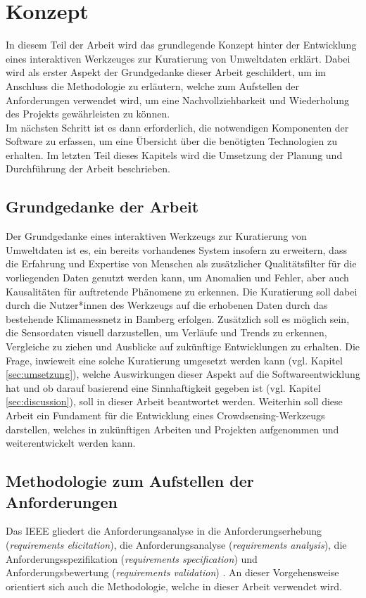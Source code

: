 \chapter{Konzept} %
In diesem Teil der Arbeit wird das grundlegende Konzept hinter der Entwicklung eines interaktiven Werkzeuges zur Kuratierung von Umweltdaten erklärt. Dabei wird als erster Aspekt der Grundgedanke dieser Arbeit geschildert, um im Anschluss die Methodologie zu erläutern, welche zum Aufstellen der Anforderungen verwendet wird, um eine Nachvollziehbarkeit und Wiederholung des Projekts gewährleisten zu können. \\ Im nächsten Schritt ist es dann erforderlich, die notwendigen Komponenten der Software zu erfassen, um eine Übersicht über die benötigten Technologien zu erhalten. Im letzten Teil dieses Kapitels wird die Umsetzung der Planung und Durchführung der Arbeit beschrieben.

\section{Grundgedanke der Arbeit}
Der Grundgedanke eines interaktiven Werkzeugs zur Kuratierung von Umweltdaten ist es, ein bereits vorhandenes System insofern zu erweitern, dass die Erfahrung und Expertise von Menschen als zusätzlicher Qualitätsfilter für die vorliegenden Daten genutzt werden kann, um Anomalien und Fehler, aber auch Kausalitäten für auftretende Phänomene zu erkennen. Die Kuratierung soll dabei durch die Nutzer*innen des Werkzeugs auf die erhobenen Daten durch das bestehende Klimamessnetz in Bamberg erfolgen. Zusätzlich soll es möglich sein, die Sensordaten visuell darzustellen, um Verläufe und Trends zu erkennen, Vergleiche zu ziehen und Ausblicke auf zukünftige Entwicklungen zu erhalten. Die Frage, inwieweit eine solche Kuratierung umgesetzt werden kann (vgl. Kapitel \ref{sec:umsetzung}), welche Auswirkungen dieser Aspekt auf die Softwareentwicklung hat und ob darauf basierend eine Sinnhaftigkeit gegeben ist (vgl. Kapitel \ref{sec:discussion}), soll in dieser Arbeit beantwortet werden. Weiterhin soll diese Arbeit ein Fundament für die Entwicklung eines Crowdsensing-Werkzeugs darstellen, welches in zukünftigen Arbeiten und Projekten aufgenommen und weiterentwickelt werden kann. 

\section{Methodologie zum Aufstellen der Anforderungen}
\label{sec:methodologyrequirements}
Das \ac{IEEE} gliedert die Anforderungsanalyse in die Anforderungserhebung (\textit{requirements elicitation}), die Anforderungsanalyse (\textit{requirements analysis}), die Anforderungsspezifikation (\textit{requirements specification}) und Anforderungsbewertung (\textit{requirements validation}) \cite{ieee2004}. An dieser Vorgehensweise orientiert sich auch die Methodologie, welche in dieser Arbeit verwendet wird.

